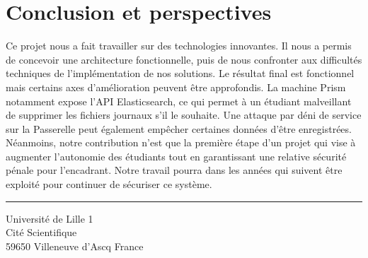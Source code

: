 \chapter*{Conclusion et perspectives}
\label{sec:conclusion}

Ce projet nous a fait travailler sur des technologies innovantes. Il nous a permis de concevoir une architecture fonctionnelle, puis de nous confronter aux difficultés techniques de l'implémentation de nos solutions. Le résultat final est fonctionnel mais certains axes d'amélioration peuvent être approfondis. La machine Prism notamment expose l'API Elasticsearch, ce qui permet à un étudiant malveillant de supprimer les fichiers journaux s'il le souhaite. Une attaque par déni de service sur la Passerelle peut également empêcher certaines données d'être enregistrées. Néanmoins, notre contribution n'est que la première étape d'un projet qui vise à augmenter l'autonomie des étudiants tout en garantissant une relative sécurité pénale pour l'encadrant. Notre travail pourra dans les années qui suivent être exploité pour continuer de sécuriser ce système. 

\appendix

\noindent\rule[2pt]{\textwidth}{0.5pt}
\begin{center}
  Université de Lille 1\\
  Cité Scientifique\\
  59650 Villeneuve d'Ascq France
\end{center}
\vspace*{\fill}

